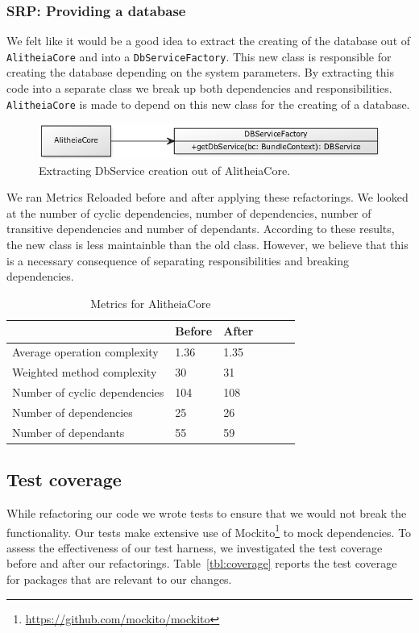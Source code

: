 \documentclass{article}
\begin{document}
\subsubsection{SRP: Providing a database}
We felt like it would be a good idea to extract the creating of the database out of \verb|AlitheiaCore| and into a \verb|DbServiceFactory|. This new class is responsible for creating the database depending on the system parameters. By extracting this code into a separate class we break up both dependencies and responsibilities. \verb|AlitheiaCore| is made to depend on this new class for the creating of a database.

\begin{figure}[h]
    \centering
    \includegraphics[width=1\textwidth]{dbfactory}
    \caption{Extracting DbService creation out of AlitheiaCore.}
    \label{fig:dbfactory}
\end{figure}

We ran Metrics Reloaded before and after applying these refactorings. We looked at the number of cyclic dependencies, number of dependencies, number of transitive dependencies and number of dependants. According to these results, the new class is less maintainble than the old class. However, we believe that this is a necessary consequence of separating responsibilities and breaking dependencies.

\begin{table}
	\centering
    \begin{tabular}{l|llll}
    ~                                 & Before & After & ~ & ~ \\ \hline
    Average operation complexity      & 1.36   & 1.35 \\
    Weighted method complexity        & 30     & 31 \\
    Number of cyclic dependencies     & 104 & 108 \\
    Number of dependencies            & 25  & 26  \\
    Number of dependants              & 55  & 59  \\
    \end{tabular}
    \caption{Metrics for AlitheiaCore}
\end{table}

\subsection{Test coverage}
While refactoring our code we wrote tests to ensure that we would not break the functionality. Our tests make extensive use of Mockito\footnote{\url{https://github.com/mockito/mockito}} to mock dependencies. To assess the effectiveness of our test harness, we investigated the test coverage before and after our refactorings. Table~\ref{tbl:coverage} reports the test coverage for packages that are relevant to our changes.
\end{document}
